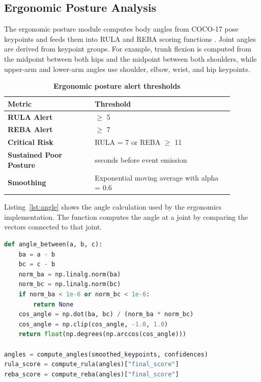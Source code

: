 \subsection{Ergonomic Posture Analysis}

The ergonomic posture module computes body angles from COCO-17 pose keypoints and feeds them into RULA and REBA scoring functions \cite{mcatamney1993rula,hignett2000reba}. Joint angles are derived from keypoint groups. For example, trunk flexion is computed from the midpoint between both hips and the midpoint between both shoulders, while upper-arm and lower-arm angles use shoulder, elbow, wrist, and hip keypoints.

\begin{table}[H]
\centering
\renewcommand{\arraystretch}{1.55}
\begin{tabular}{|>{\centering\arraybackslash}p{0.34\linewidth}|>{\centering\arraybackslash}p{0.54\linewidth}|}
\hline
\textbf{Metric} & \textbf{Threshold} \\
\hline
\textbf{RULA Alert} & $\geq$ 5 \\
\hline
\textbf{REBA Alert} & $\geq$ 7 \\
\hline
\textbf{Critical Risk} & RULA = 7 or REBA $\geq$ 11 \\
\hline
\textbf{Sustained Poor Posture} & 4 seconds before event emission \\
\hline
\textbf{Smoothing} & Exponential moving average with alpha = 0.6 \\
\hline
\end{tabular}
\caption{\textbf{Ergonomic posture alert thresholds}}
\label{tab:chapter5-ergonomic-thresholds}
\end{table}

Listing~\ref{lst:angle} shows the angle calculation used by the ergonomics implementation. The function computes the angle at a joint by comparing the vectors connected to that joint.

\begin{lstlisting}[language=Python,caption={Joint angle calculation for RULA/REBA},label={lst:angle}]
def angle_between(a, b, c):
    ba = a - b
    bc = c - b
    norm_ba = np.linalg.norm(ba)
    norm_bc = np.linalg.norm(bc)
    if norm_ba < 1e-6 or norm_bc < 1e-6:
        return None
    cos_angle = np.dot(ba, bc) / (norm_ba * norm_bc)
    cos_angle = np.clip(cos_angle, -1.0, 1.0)
    return float(np.degrees(np.arccos(cos_angle)))

angles = compute_angles(smoothed_keypoints, confidences)
rula_score = compute_rula(angles)["final_score"]
reba_score = compute_reba(angles)["final_score"]
\end{lstlisting}

